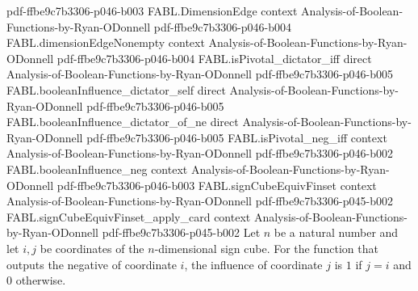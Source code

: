 \begin{theorem}
  {pdf-ffbe9c7b3306-p046-b003}
\proofstep
  {FABL.DimensionEdge}
  {context}
  {Analysis-of-Boolean-Functions-by-Ryan-ODonnell}
  {pdf-ffbe9c7b3306-p046-b004}
\proofstep
  {FABL.dimensionEdgeNonempty}
  {context}
  {Analysis-of-Boolean-Functions-by-Ryan-ODonnell}
  {pdf-ffbe9c7b3306-p046-b004}
\proofstep
  {FABL.isPivotal_dictator_iff}
  {direct}
  {Analysis-of-Boolean-Functions-by-Ryan-ODonnell}
  {pdf-ffbe9c7b3306-p046-b005}
\proofstep
  {FABL.booleanInfluence_dictator_self}
  {direct}
  {Analysis-of-Boolean-Functions-by-Ryan-ODonnell}
  {pdf-ffbe9c7b3306-p046-b005}
\proofstep
  {FABL.booleanInfluence_dictator_of_ne}
  {direct}
  {Analysis-of-Boolean-Functions-by-Ryan-ODonnell}
  {pdf-ffbe9c7b3306-p046-b005}
\proofstep
  {FABL.isPivotal_neg_iff}
  {context}
  {Analysis-of-Boolean-Functions-by-Ryan-ODonnell}
  {pdf-ffbe9c7b3306-p046-b002}
\proofstep
  {FABL.booleanInfluence_neg}
  {context}
  {Analysis-of-Boolean-Functions-by-Ryan-ODonnell}
  {pdf-ffbe9c7b3306-p046-b003}
\proofstep
  {FABL.signCubeEquivFinset}
  {context}
  {Analysis-of-Boolean-Functions-by-Ryan-ODonnell}
  {pdf-ffbe9c7b3306-p045-b002}
\proofstep
  {FABL.signCubeEquivFinset_apply_card}
  {context}
  {Analysis-of-Boolean-Functions-by-Ryan-ODonnell}
  {pdf-ffbe9c7b3306-p045-b002}
Let $n$ be a natural number and let $i,j$ be coordinates of the $n$-dimensional sign
cube. For the function that outputs the negative of coordinate $i$, the influence of
coordinate $j$ is $1$ if $j=i$ and $0$ otherwise.
\end{theorem}

